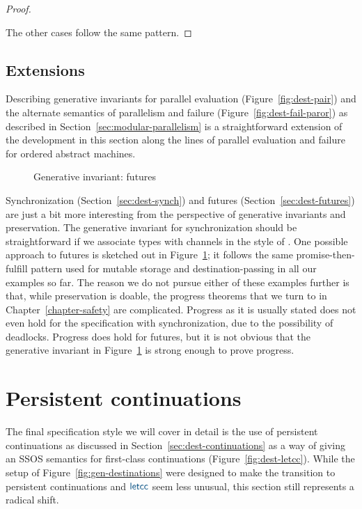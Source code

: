 \begin{proof}
\begin{description}
\medskip

\end{description}

\noindent
The other cases follow the same pattern.
\end{proof}

\subsection{Extensions}

Describing generative invariants for parallel evaluation
(Figure~\ref{fig:dest-pair}) and the alternate semantics of
parallelism and failure (Figure~\ref{fig:dest-fail-paror}) as
described in Section~\ref{sec:modular-parallelism} is a
straightforward extension of the development in this section along the
lines of parallel evaluation and failure for ordered abstract
machines.

\begin{figure}[tp]
\caption{Generative invariant: futures}
\label{fig:gen-future} 
\end{figure}

Synchronization (Section~\ref{sec:dest-synch}) and futures
(Section~\ref{sec:dest-futures}) are just a bit more interesting from
the perspective of generative invariants and preservation. The
generative invariant for synchronization should be straightforward if
we associate types with channels in the style of \cite[Section
41.5]{harper12practical}. One possible approach to futures is sketched
out in Figure~\ref{fig:gen-future}; it follows the same
promise-then-fulfill pattern used for mutable storage and
destination-passing in all our examples so far. The reason we do not
pursue either of these examples further is that, while preservation is
doable, the progress theorems that we turn to in
Chapter~\ref{chapter-safety} are complicated. Progress as it is
usually stated does not even hold for the specification with
synchronization, due to the possibility of deadlocks. Progress does
hold for futures, but it is not obvious that the generative invariant
in Figure~\ref{fig:gen-future} is strong enough to prove progress.


\section{Persistent continuations}
\label{sec:gen-letcc}

The final specification style we will cover in detail is the use of
persistent continuations as discussed in
Section~\ref{sec:dest-continuations} as a way of giving an SSOS
semantics for first-class continuations (Figure~\ref{fig:dest-letcc}).
While the setup of Figure~\ref{fig:gen-destinations} were designed to
make the transition to persistent continuations and $\obj{\sf letcc}$
seem less unusual, this section still represents a radical shift.  

